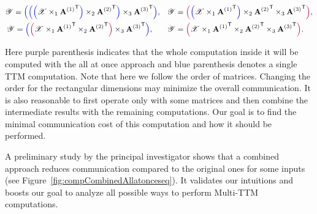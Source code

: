 \documentclass[a4paper,11pt]{article}
\newcommand{\X}{\T{X}}
\newcommand{\Y}{\T{Y}}
\newcommand{\allatoncecolor}{\color{purple}}
\newcommand{\seqcolor}{\color{blue}}
\newcommand{\allatoncestart}{{\allatoncecolor\Big(}}
\newcommand{\allatonceend}{{\allatoncecolor\Big)}}
\newcommand{\seqstart}{{\seqcolor\Big(}}
\newcommand{\seqend}{{\seqcolor\Big)}}
\newcommand{\sk}[1]{{\color{blue} \emph{#1}}}
\begin{document}
	\vspace*{-0.375cm}\begin{align*}
\Y=\seqstart\seqstart\seqstart\X\times_1{\Mn{A}{1}}^\Tra \seqend\times_2{\Mn{A}{2}}^\Tra\seqend\times_3{\Mn{A}{3}}^\Tra\seqend,\quad & \Y=\allatoncestart\seqstart\X \times_1 {\Mn{A}{1}}^\Tra \seqend \times_2 {\Mn{A}{2}}^\Tra \times_3 {\Mn{A}{3}}^\Tra \allatonceend,\\
\Y = \seqstart\allatoncestart\X \times_1 {\Mn{A}{1}}^\Tra \times_2 {\Mn{A}{2}}^\Tra\allatonceend \times_3 {\Mn{A}{3}}^\Tra\seqend,\qquad & \Y = \allatoncestart\X \times_1 {\Mn{A}{1}}^\Tra \times_2 {\Mn{A}{2}}^\Tra \times_3 {\Mn{A}{3}}^\Tra\allatonceend.
\end{align*}\vspace*{-0.35cm}

	Here purple parenthesis indicates that the whole computation inside it will be computed with the all at once approach and blue parenthesis denotes a single TTM computation.  Note that here we follow the order of matrices. Changing the order for the rectangular dimensions may minimize the overall communication. It is also reasonable to first operate only with some matrices and then combine the intermediate results with the remaining computations. Our goal is to find the minimal communication cost of this computation and how it should be performed. 
	

	A preliminary study by the principal investigator shows that a combined approach reduces communication compared to the original ones for some inputs (see Figure~\ref{fig:compCombinedAllatonceseq}). It validates our intuitions and boosts our goal to analyze all possible ways to perform  Multi-TTM computations.



\end{document}

